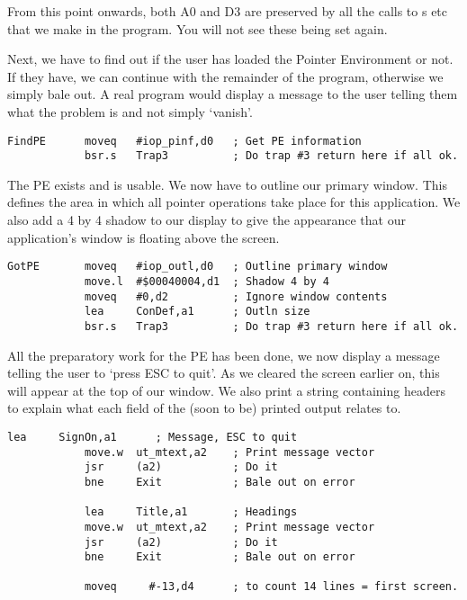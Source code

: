 From this point onwards, both A0 and D3 are preserved by all the calls to s etc that
we make in the program. You will not see these being set again.

Next, we have to find out if the user has loaded the Pointer Environment or not. If they
have, we can continue with the remainder of the program, otherwise we simply bale out. A
real program would display a message to the user telling them what the problem is and not
simply `vanish'.

\begin{lstlisting}[firstnumber=last,caption={Pointer Record Examiner - Get Pointer Environment}]
FindPE      moveq   #iop_pinf,d0   ; Get PE information
            bsr.s   Trap3          ; Do trap #3 return here if all ok.
\end{lstlisting}

The PE exists and is usable. We now have to outline our primary window. This defines the
area in which all pointer operations take place for this application. We also add a 4 by 4
shadow to our display to give the appearance that our application's window is floating
above the screen.

\begin{lstlisting}[firstnumber=last,caption={Pointer Record Examiner - Outline Primary Window}]
GotPE       moveq   #iop_outl,d0   ; Outline primary window
            move.l  #$00040004,d1  ; Shadow 4 by 4
            moveq   #0,d2          ; Ignore window contents
            lea     ConDef,a1      ; Outln size
            bsr.s   Trap3          ; Do trap #3 return here if all ok.
\end{lstlisting}

All the preparatory work for the PE has been done, we now display a message telling the
user to `press ESC to quit'. As we cleared the screen earlier on, this will appear at the
top of our window. We also print a string containing headers to explain what each field of
the (soon to be) printed output relates to.

\begin{lstlisting}[firstnumber=last,caption={Pointer Record Examiner - Sign On}]
            lea     SignOn,a1      ; Message, ESC to quit
            move.w  ut_mtext,a2    ; Print message vector
            jsr     (a2)           ; Do it
            bne     Exit           ; Bale out on error

            lea     Title,a1       ; Headings
            move.w  ut_mtext,a2    ; Print message vector
            jsr     (a2)           ; Do it
            bne     Exit           ; Bale out on error

            moveq     #-13,d4      ; to count 14 lines = first screen.
\end{lstlisting}

